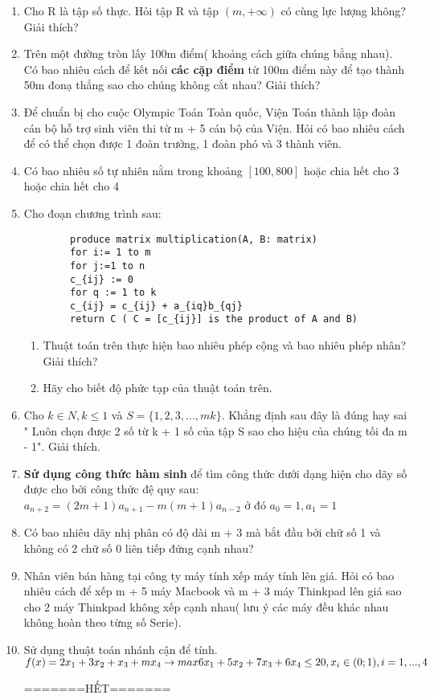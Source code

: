 \documentclass[12pt,oneside]{book}
\begin{document}
\begin{enumerate}[label = {\bf Câu \arabic*.}]
	\item Cho R là tập số thực. Hỏi tập R và tập $(m, +\infty)$ có cùng lực lượng không? Giải thích?
	\item Trên một đường tròn lấy 100m điểm( khoảng cách giữa chúng bằng nhau). Có bao nhiêu cách để kết nối \textbf{các cặp điểm} từ 100m điểm này để tạo thành 50m đonạ thẳng sao cho chúng không cắt nhau? Giải thích?
	\item Để chuẩn bị cho cuộc Olympic Toán Toàn quốc, Viện Toán thành lập đoàn cán bộ hỗ trợ sinh viên thi từ m + 5 cán bộ của Viện. Hỏi có bao nhiêu cách để có thể chọn được 1 đoàn trưởng, 1 đoàn phó và 3 thành viên.
	\item Có bao nhiêu số tự nhiên nằm trong khoảng $[100,800]$ hoặc chia hết cho 3 hoặc chia hết cho 4
	\item Cho đoạn chương trình sau:
	\begin{lstlisting}
		produce matrix multiplication(A, B: matrix)
		for i:= 1 to m
		for j:=1 to n
		c_{ij} := 0 
		for q := 1 to k 
		c_{ij} = c_{ij} + a_{iq}b_{qj}
		return C ( C = [c_{ij}] is the product of A and B)
	\end{lstlisting}
	\begin{enumerate}
		\item Thuật toán trên thực hiện bao nhiêu phép cộng và bao nhiêu phép nhân? Giải thích?
		\item Hãy cho biết độ phức tạp của thuật toán trên.
	\end{enumerate}
	\item Cho $k\in N, k \leq 1$ và $S = \{1, 2, 3,..., mk\}$. Khẳng định sau đây là đúng hay sai " Luôn chọn được 2 số từ k + 1 số của tập S sao cho hiệu của chúng tối đa m - 1". Giải thích.
	\item {\bf Sử dụng công thức hàm sinh} để tìm công thức dưới dạng hiện cho dãy số được cho bởi công thức đệ quy sau: $a_{n+2} = (2m+1)a_{n+1}-m(m+1)a_{n-2}$ ở đó $a_0 = 1, a_1 = 1$
	\item Có bao nhiêu dãy nhị phân có độ dài m + 3 mà bắt đầu bởi chữ số 1 và không có 2 chữ số 0 liên tiếp đứng cạnh nhau?
	\item Nhân viên bán hàng tại công ty máy tính xếp máy tính lên giá. Hỏi có bao nhiêu cách để xếp m + 5 máy Macbook và m + 3 máy Thinkpad lên giá sao cho 2 máy Thinkpad không xếp cạnh nhau( lưu ý các máy đều khác nhau không hoàn theo từng số Serie).
	\item Sử dụng thuật toán nhánh cận để tính.\\
	$f(x)= 2x_1+3x_2+x_3+mx_4 \rightarrow max\\
	6x_1+5x_2+7x_3+6x_4 \leq 20, x_i \in (0;1), i = 1,...,4
	$
	\begin{center}
		=======HẾT=======
	\end{center}
\end{enumerate}
\end{document}
